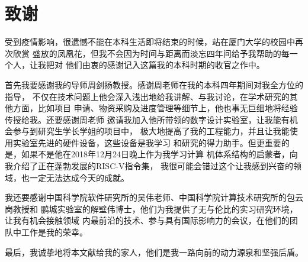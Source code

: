 
\chapter*{致谢}
受到疫情影响，很遗憾不能在本科生活即将结束的时候，站在厦门大学的校园中再次欣赏
盛放的凤凰花，但我不会因为时间与距离而淡忘四年间给予我帮助的每一个人，让我把对
他们由衷的感谢记入这篇我的本科时期的收官之作中。

首先我要感谢我的导师周剑扬教授。感谢周老师在我的本科四年期间对我全方位的指导，
不仅在技术问题上他会深入浅出地给我讲解、与我讨论，在学术研究的其他方面，比如项目
申请、物资采购及进度管理等细节上，他也事无巨细地将经验传授给我。还要感谢周老师
邀请我加入他所带领的数字设计实验室，让我能有机会参与到研究生学长学姐的项目中，
极大地提高了我的工程能力，并且让我能使用实验室先进的硬件设备，这些设备是我学习
和研究的得力助手。但更重要的是，如果不是他在2018年12月24日晚上作为我学习计算
机体系结构的启蒙者，向我介绍了正在蓬勃发展的RISC-V指令集，
我很可能会错过这个让我感到兴奋的领域，也一定无法达成今天的成就。

我还要感谢中国科学院软件研究所的吴伟老师、中国科学院计算技术研究所的包云岗教授和
鹏城实验室的解壁伟博士，他们为我提供了无与伦比的实习研究环境，让我有机会接触领域
内最前沿的技术、参与具有国际影响力的会议，在他们的团队中工作是我的荣幸。

最后，我诚挚地将本文献给我的家人，他们是我一路向前的动力源泉和坚强后盾。